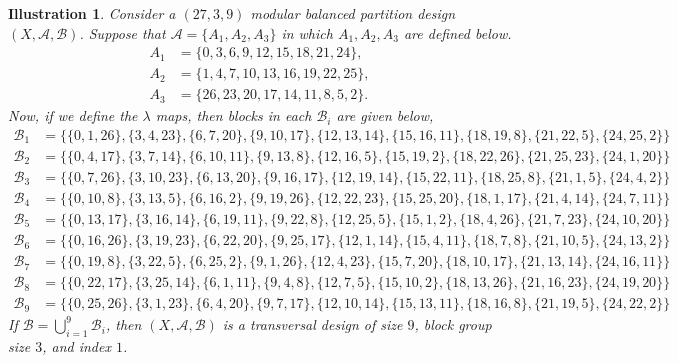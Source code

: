 \documentclass[preprint,11pt]{elsarticle}
\newtheorem{illustration}[theorem]{Illustration}
\begin{document}
 \begin{illustration}
         Consider a $(27,3,9)$ modular balanced partition design $(X, \mathcal{A}, \mathcal{B})$. Suppose that $\mathcal{A}=\{A_1, A_2, A_3\}$ in which $A_1,A_2, A_3$ are defined below.
          \begin{align*}
             A_1& =\{0, 3,6,9,12,15,18, 21,24\},\\
             A_2 & =\{1,4,7,10,13,16,19,22, 25\},\\
             A_3 & =\{26,23,20, 17,14,11,8,5,2\}.
         \end{align*}
         Now, if we define the $\lambda$ maps, then blocks in each $\mathcal{B}_i$ are given below, 
\small{\begin{align*}
   \mathcal{B}_1& = \{ \{0,1,26\}, \{3,4,23\}, \{6,7,20\}, \{9,10,17\},\{12,13,14\},\{15,16,11\}, \{18,19,8\},\{21,22,5\}, \{24,25,2\}\}\\
     \mathcal{B}_2& = \{\{0,4,17\}, \{3,7,14\},\{6,10,11\}, \{9,13,8\}, \{12,16,5\}, \{15,19,2\}, \{18,22,26\}, \{21,25,23\}, \{24,1,20\}\}\\
     \mathcal{B}_3& =\{ \{0,7,26\}, \{3,10,23\}, \{6,13,20\}, \{9,16,17\}, \{12,19,14\}, \{15, 22, 11\}, \{18,25,8\}, \{21,1,5\}, \{24,4,2\}\}\\
     \mathcal{B}_4& = \{\{0,10,8\},\{3,13,5\}, \{6,16,2\}, \{9, 19, 26\}, \{12, 22, 23\}, \{15,25,20\}, \{18,1,17\}, \{21,4,14\}, \{24,7,11\}\}\\
     \mathcal{B}_5 &=\{\{0,13,17\}, \{3,16,14\}, \{6, 19,11\}, \{9, 22,8\}, \{12,25,5\}, \{15, 1,2\}, \{18,4,26\}, \{21,7,23\}, \{24,10,20\}\}\\
      \mathcal{B}_6 &=\{\{0,16,26\}, \{3,19,23\}, \{6, 22,20\}, \{9, 25,17\}, \{12,1,14\}, \{15,4,11\}, \{18,7,8\}, \{21,10,5\}, \{24,13,2\}\}\\
      \mathcal{B}_7 &=\{\{0,19,8\}, \{3,22,5\}, \{6, 25,2\}, \{9, 1,26\}, \{12,4,23\}, \{15,7,20\}, \{18,10,17\}, \{21,13,14\}, \{24,16,11\}\}\\
       \mathcal{B}_8 &=\{\{0,22,17\}, \{3,25,14\}, \{6, 1,11\}, \{9, 4,8\}, \{12,7,5\}, \{15,10,2\}, \{18,13,26\}, \{21,16,23\}, \{24,19,20\}\}\\
        \mathcal{B}_9 &=\{\{0,25,26\}, \{3,1,23\}, \{6, 4,20\}, \{9, 7,17\}, \{12,10,14\}, \{15,13,11\}, \{18,16,8\}, \{21,19,5\}, \{24,22,2\}\}
      \end{align*}}
\noindent If $\displaystyle \mathscr{B}=\bigcup_{i=1}^9 \mathcal{B}_i$, then $(X,\mathcal{A}, \mathscr{B})$ is a transversal design of size $9$, block group size $3$, and index $1$. 
 \end{illustration}
  
\end{document}
